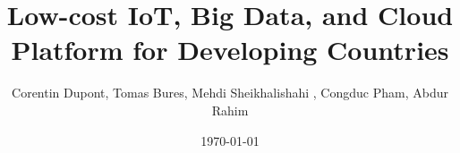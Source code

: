 \documentclass{llncs}
\begin{document}
\title{Low-cost IoT, Big Data, and Cloud Platform for Developing Countries}

\author{Corentin Dupont, Tomas Bures, Mehdi Sheikhalishahi , Congduc Pham, Abdur Rahim}		 



\date{\today}

\maketitle

\begin{abstract}

\end{abstract}







%


%
%
%






\end{document}
